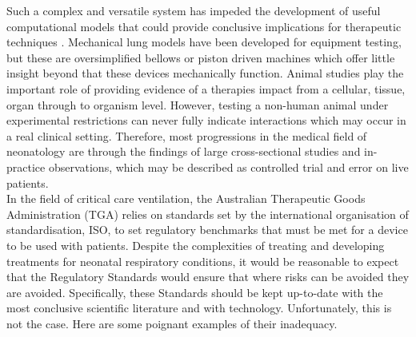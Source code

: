 \documentclass[12pt, openany, oneside]{book}
\begin{document}
Such a complex and versatile system has impeded the development of useful computational models that could provide conclusive implications for therapeutic techniques \citep{oakes2018airflow}. Mechanical lung models have been developed for equipment testing, but these are oversimplified bellows or piston driven machines which offer little insight beyond that these devices mechanically function. Animal studies play the important role of providing evidence of a therapies impact from a cellular, tissue, organ through to organism level. However, testing a non-human animal under experimental restrictions can never fully indicate interactions which may occur in a real clinical setting. Therefore, most progressions in the medical field of neonatology are through the findings of large cross-sectional studies and in-practice observations, which may be described as controlled trial and error on live patients. \\

In the field of critical care ventilation, the Australian Therapeutic Goods Administration (TGA) relies on standards set by the international organisation of standardisation, ISO, to set regulatory benchmarks that must be met for a device to be used with patients. Despite the complexities of treating and developing treatments for neonatal respiratory conditions, it would be reasonable to expect that the Regulatory Standards would ensure that where risks can be avoided they are avoided. Specifically, these Standards should be kept up-to-date with the most conclusive scientific literature and with technology. Unfortunately, this is not the case. Here are some poignant examples of their inadequacy.
\end{document}
